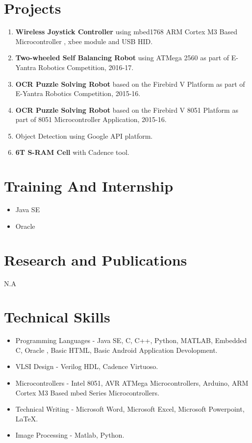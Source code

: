\documentclass[margin,line]{res}
\begin{document}
\begin{resume}
\section{\sc Projects}
\begin{enumerate}
	\item \textbf{Wireless Joystick Controller} using mbed1768 ARM Cortex M3 Based Microcontroller , xbee module and USB HID.
	\item \textbf{Two-wheeled Self Balancing Robot} using ATMega 2560 as part of E-Yantra Robotics Competition, 2016-17.
	\item \textbf{OCR Puzzle Solving Robot} based on the Firebird V Platform as part of E-Yantra Robotics Competition, 2015-16.
	\item \textbf{OCR Puzzle Solving Robot} based on the Firebird V 8051 Platform as part of 8051 Microcontroller Application, 2015-16.	
	\item Object Detection using Google API platform.
	\item \textbf{6T S-RAM Cell} with Cadence tool.		    
\end{enumerate}

\section{\sc Training And Internship}
\begin{itemize}
	\item Java SE
	\item Oracle
\end{itemize}

\section{\sc Research and Publications}
N.A\\

\section{\sc Technical Skills}
\begin{itemize}
	\item Programming Languages - Java SE, C, C++, Python, MATLAB, Embedded C, Oracle , Basic HTML, Basic Android Application Devolopment.
	\item VLSI Design - Verilog HDL, Cadence Virtuoso.
	\item Microcontrollers - Intel 8051, AVR ATMega Microcontrollers, Arduino, ARM Cortex M3 Based mbed Series Microcontrollers.
	\item Technical Writing - Microsoft Word, Microsoft Excel, Microsoft Powerpoint, LaTeX.
	\item Image Processing - Matlab, Python.
\end{itemize}


\end{resume}
\end{document}
